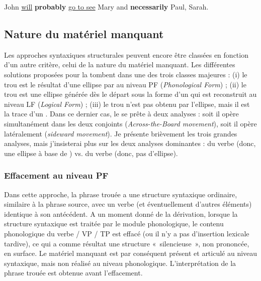 \ea \label{ch2:ex198}
John \uline{will} \textbf{probably} \uline{go to see} Mary and \textbf{necessarily} Paul, Sarah. \citep[49]{Gardent1991} 
\z


\subsection{Nature du matériel manquant} \label{ch2:sect2.4.2}

Les approches syntaxiques structurales peuvent encore être classées en fonction d’un autre critère, celui de la nature du matériel manquant. Les différentes solutions proposées pour la  tombent dans une des trois classes majeures : (i) le trou est le résultat d’une ellipse par  au niveau PF (\textit{Phonological Form}) ; (ii) le trou est une ellipse générée dès le départ sous la forme d’un  qui est reconstruit au niveau LF (\textit{Logical Form}) ; (iii) le trou n’est pas obtenu par l’ellipse, mais il est la trace d’un . Dans ce dernier cas, le  se prête à deux analyses : soit il opère simultanément dans les deux conjoints (\textit{Across-the-Board movement}), soit il opère latéralement (\textit{sideward movement}). Je présente brièvement les trois grandes analyses, mais j’insisterai plus sur les deux analyses dominantes :  du verbe (donc, une ellipse à base de ) vs.  du verbe (donc, pas d’ellipse).

\subsubsection{Effacement au niveau PF} \label{ch2:sect2.4.2.1}
Dans cette approche, la phrase trouée a une structure syntaxique ordinaire, similaire à la phrase source, avec un verbe (et éventuellement d’autres éléments) identique à son antécédent. A un moment donné de la dérivation, lorsque la structure syntaxique est traitée par le module phonologique, le contenu phonologique du verbe / VP / TP est effacé (ou il n’y a pas d’insertion lexicale tardive), ce qui a comme résultat une structure «~silencieuse~», non prononcée, en surface. Le matériel manquant est par conséquent présent et articulé au niveau syntaxique, mais non réalisé au niveau phonologique. L’interprétation de la phrase trouée est obtenue avant l’effacement.

